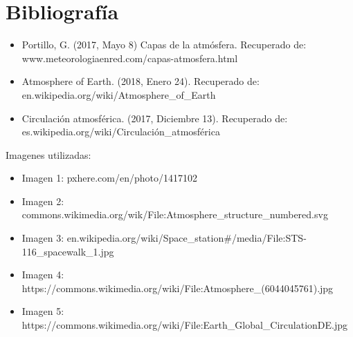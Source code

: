 \documentclass{article} %
\begin{document}
\section {Bibliografía}

\begin{itemize}
    \item Portillo, G. (2017, Mayo 8) Capas de la atmósfera. Recuperado de: www.meteorologiaenred.com/capas-atmosfera.html
    \item Atmosphere of Earth. (2018, Enero 24). Recuperado de: en.wikipedia.org/wiki/Atmosphere\_of\_Earth
    \item Circulación atmosférica. (2017, Diciembre 13). Recuperado de:
es.wikipedia.org/wiki/Circulación\_atmosférica \\
\end{itemize}

Imagenes utilizadas: 
\begin{itemize}
    \item Imagen 1: pxhere.com/en/photo/1417102
    \item Imagen 2: commons.wikimedia.org/wik/File:Atmosphere\_structure\_numbered.svg
    \item Imagen 3: en.wikipedia.org/wiki/Space\_station\#/media/File:STS-116\_spacewalk\_1.jpg
        \item Imagen 4: https://commons.wikimedia.org/wiki/File:Atmosphere\_(6044045761).jpg
    \item Imagen 5: https://commons.wikimedia.org/wiki/File:Earth\_Global\_Circulation\-DE.jpg

\end{itemize}
\end{document}
